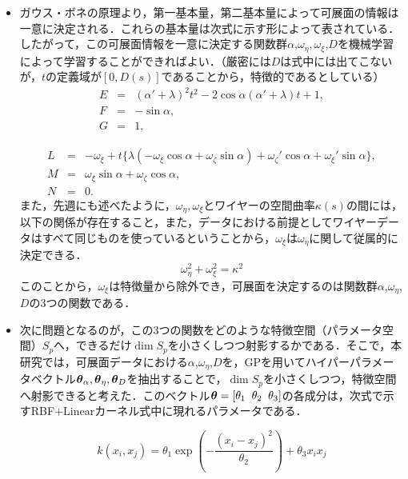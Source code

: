 \documentclass[11pt]{jsarticle}
\begin{document}
			\begin{itemize}
				\item ガウス・ボネの原理より，第一基本量，第二基本量によって可展面の情報は一意に決定される．これらの基本量は次式に示す形によって表されている．したがって，この可展面情報を一意に決定する関数群$ \alpha $,$ \omega_{\eta} , \omega_{\xi}$,$ D $を機械学習によって学習することができればよい．（厳密には$ D $は式中には出てこないが，$ t $の定義域が$ [0,D(s)] $であることから，特徴的であるとしている）
				\begin{eqnarray}
				E &=& (\alpha'+\lambda)^2 t^2 -2\cos \alpha(\alpha'+\lambda) t + 1,\\
				F &=& -\sin \alpha,\\
				G &=& 1,
				\end{eqnarray}
				
				\begin{eqnarray}
				L &=& -\omega_{\xi}+t\{\lambda(-\omega_{\xi}\cos \alpha + \omega_{\zeta}\sin \alpha)+\omega_{\zeta}'\cos \alpha + \omega_{\xi}'\sin \alpha \},  \\
				M &=& \omega_{\xi}\sin \alpha + \omega_{\zeta} \cos \alpha,  \\
				N &=& 0. 
				\end{eqnarray}
				また，先週にも述べたように，$  \omega_{\eta} , \omega_{\xi} $とワイヤーの空間曲率$ \kappa (s) $の間には，以下の関係が存在すること，また，データにおける前提としてワイヤーデータはすべて同じものを使っているということから，$ \omega_{\xi} $は$ \omega_{\eta} $に関して従属的に決定できる．
				\begin{equation}\label{eq:kappaeq}
					\omega_{\eta}^2 + \omega_{\xi}^2 = \kappa^2
				\end{equation}
				このことから，$ \omega_{\xi} $は特徴量から除外でき，可展面を決定するのは関数群$ \alpha $,$ \omega_{\eta} $,$ D $の3つの関数である．
				
				\item 次に問題となるのが，この3つの関数をどのような特徴空間（パラメータ空間）$ S_p $へ，できるだけ$ \dim{S_p} $を小さくしつつ射影するかである．そこで，本研究では，可展面データにおける$ \alpha $,$ \omega_{\eta} $,$ D $を，GPを用いてハイパーパラメータベクトル$ \boldsymbol{\theta}_{\alpha},\boldsymbol{\theta}_{\eta},\boldsymbol{\theta}_{D} $を抽出することで，$ \dim{S_p} $を小さくしつつ，特徴空間へ射影できると考えた．このベクトル$ \boldsymbol{\theta} = [\theta_1 \;\; \theta_2 \;\; \theta_3] $の各成分は，次式で示すRBF+Linearカーネル式中に現れるパラメータである．
				
				\begin{equation}\label{eq:RBFLinear}
					k(x_i,x_j) = \theta_1 \exp \left( -\frac{(x_i-x_j)^2}{\theta_2} \right) + \theta_3 x_i x_j
				\end{equation}
				

\end{itemize}
\end{document}
